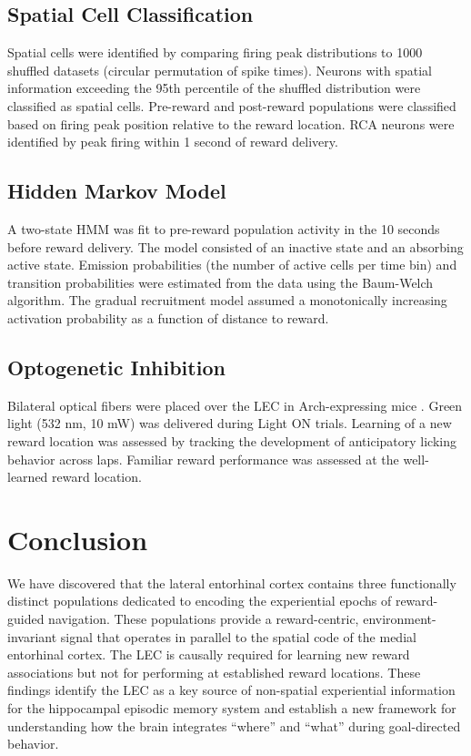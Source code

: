 \documentclass[11pt]{article}
\begin{document}
\subsection{Spatial Cell Classification}

Spatial cells were identified by comparing firing peak distributions to 1000 shuffled datasets (circular permutation of spike times). Neurons with spatial information exceeding the 95th percentile of the shuffled distribution were classified as spatial cells. Pre-reward and post-reward populations were classified based on firing peak position relative to the reward location. RCA neurons were identified by peak firing within 1 second of reward delivery.

\subsection{Hidden Markov Model}

A two-state HMM was fit to pre-reward population activity in the 10 seconds before reward delivery. The model consisted of an inactive state and an absorbing active state. Emission probabilities (the number of active cells per time bin) and transition probabilities were estimated from the data using the Baum-Welch algorithm. The gradual recruitment model assumed a monotonically increasing activation probability as a function of distance to reward.

\subsection{Optogenetic Inhibition}

Bilateral optical fibers were placed over the LEC in Arch-expressing mice \citep{chow2010, boyden2005}. Green light (532 nm, 10 mW) was delivered during Light ON trials. Learning of a new reward location was assessed by tracking the development of anticipatory licking behavior across laps. Familiar reward performance was assessed at the well-learned reward location.

\section{Conclusion}

We have discovered that the lateral entorhinal cortex contains three functionally distinct populations dedicated to encoding the experiential epochs of reward-guided navigation. These populations provide a reward-centric, environment-invariant signal that operates in parallel to the spatial code of the medial entorhinal cortex. The LEC is causally required for learning new reward associations but not for performing at established reward locations. These findings identify the LEC as a key source of non-spatial experiential information for the hippocampal episodic memory system and establish a new framework for understanding how the brain integrates ``where'' and ``what'' during goal-directed behavior.


\end{document}
